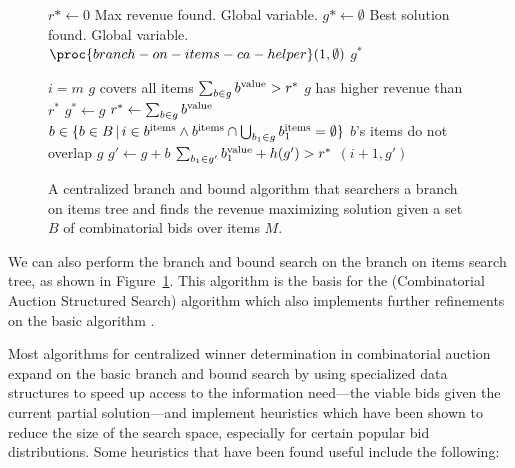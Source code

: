 \begin{figure}
  \begin{minipage}{1.0\linewidth}
    \begin{codebox}
      \li $r* \gets 0$ \>\>\>\Comment Max revenue found. Global variable.
      \li $g* \gets \emptyset$ \>\>\>\Comment Best solution found. Global
      variable.
      \li $\proc{branch-on-items-ca-helper}(1,\emptyset)$
      \li \Return $g^*$
    \end{codebox}
    \begin{codebox}
    \li \If $i = m$   \>\>\>\>\>\>\>\>\>\>\> \Comment $g$
    covers all items
    \li \Then \If $\sum_{b \in g} b^{\text{value}} > r^*$ \>\>\>\>\>\>\>\>\>
    \Comment $g$ has higher revenue than $r^*$
    \li       \Then $g^* \gets g$
    \li             $r^* \gets \sum_{b \in g} b^{\text{value}}$
              \End
    \li       \Return
        \End              
    \li \For $b \in \{b \in B \,|\, i \in b^{\text{items}} \wedge b^{\text{items}} \cap \bigcup_{b_1 \in g}
    b_1^{\text{items}} = \emptyset\} $ \Comment $b$'s items do not overlap $g$ 
    \li \Do $g' \gets g + b$
    \li     \If $\sum_{b_1 \in g'} b_1^{\text{value}} + h(g') > r^*$
    \li     \Then {}$(i+1, g')$
            \End
        \End
  \end{codebox}
  \end{minipage}
  \caption{A centralized branch and bound algorithm that searchers a
    branch on items tree and finds the revenue maximizing solution
    given a set $B$ of combinatorial bids over items $M$.}
  \label{fig:bb-boi-ca}
\end{figure}


We can also perform the branch and bound search on the
branch on items search tree, as shown in Figure~\ref{fig:bb-boi-ca}.
This algorithm is the basis for the  (Combinatorial Auction
Structured Search) algorithm which also implements further refinements
on the basic algorithm \cite{fujishima99a}.

Most algorithms for centralized winner determination in combinatorial
auction expand on the basic branch and bound search by using
specialized data structures to speed up access to the information
need---the viable bids given the current partial solution---and
implement heuristics which have been shown to reduce the size of the
search space, especially for certain popular bid distributions.  Some
heuristics that have been found useful include the following:

